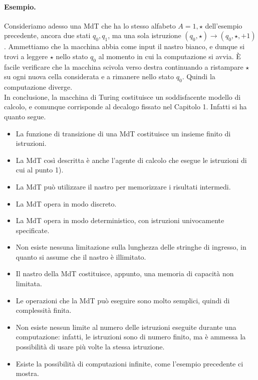 \paragraph{Esempio.}
Consideriamo adesso una MdT che ha lo stesso alfabeto $A = {1, \star}$
dell'esempio precedente, ancora due stati $q_0, q_1$, ma una sola istruzione
$(q_0, \star) \rightarrow (q_0, \star, +1)$. Ammettiamo che la macchina abbia
come input il nastro bianco, e dunque si trovi a leggere $\star$ nello
stato $q_0$ al momento in cui la computazione si avvia. È facile verificare che
la macchina scivola verso destra continuando a ristampare $\star$ su ogni nuova
cella considerata e a rimanere nello stato $q_0$. Quindi la computazione diverge.\\

In conclusione, la macchina di Turing costituisce un soddisfacente modello di
calcolo, e comunque corrisponde al decalogo fissato nel Capitolo 1. Infatti si ha
quanto segue.

\begin{itemize}
    \item La funzione di transizione di una MdT costituisce un insieme finito di
          istruzioni.
    \item La MdT così descritta è anche l'agente di calcolo che esegue le istruzioni
          di cui al punto 1).
    \item La MdT può utilizzare il nastro per memorizzare i risultati intermedi.
    \item La MdT opera in modo discreto.
    \item La MdT opera in modo deterministico, con istruzioni univocamente
          specificate.
    \item Non esiste nessuna limitazione sulla lunghezza delle stringhe di ingresso,
          in quanto si assume che il nastro è illimitato.
    \item Il nastro della MdT costituisce, appunto, una memoria di capacità non
          limitata.
    \item Le operazioni che la MdT può eseguire sono molto semplici, quindi di
          complessità finita.
    \item Non esiste nessun limite al numero delle istruzioni eseguite durante una
          computazione: infatti, le istruzioni sono di numero finito, ma è ammessa la
          possibilità di usare più volte la stessa istruzione.
    \item Esiste la possibilità di computazioni infinite, come l'esempio precedente
          ci mostra.
\end{itemize}
